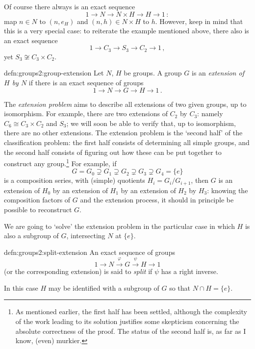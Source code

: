 Of course there always is an exact sequence
\[1 \longrightarrow N \longrightarrow N \times H \longrightarrow H
  \longrightarrow 1\,:\] map $n \in N$ to $(n, e_H)$ and
$(n, h) \in N \times H$ to $h$.  However, keep in mind that this is a
very special case: to reiterate the example mentioned above, there
also is an exact sequence
\[1 \longrightarrow C_3 \longrightarrow S_3 \longrightarrow C_2
  \longrightarrow 1\,,\] yet $S_3 \not\cong C_3 \times C_2$.
\begin{defn}{}{defn:groups2:group-extension}
  Let $N$, $H$ be groups. A group $G$ is an \emph{extension of $H$ by
    $N$} if there is an exact sequence of groups
  \[1 \longrightarrow N \longrightarrow G \longrightarrow H
    \longrightarrow 1\,.\]
\end{defn}
The \emph{extension problem} aims to describe all extensions of two
given groups, up to isomorphism. For example, there are two extensions
of $C_2$ by $C_3$: namely $C_6 \cong C_3 \times C_2$ and $S_3$; we
will soon be able to verify that, up to isomorphism, there are no
other extensions.  The extension problem is the `second half' of the
classification problem: the first half consists of determining all
simple groups, and the second half consists of figuring out how these
can be put together to construct any group.\footnote{As mentioned
  earlier, the first half has been settled, although the complexity of
  the work leading to its solution justifies some skepticism
  concerning the absolute correctness of the proof. The status of the
  second half is, as far as I know, (even) murkier.} For example, if
\[G = G_0 \supsetneq G_1 \supsetneq G_2 \supsetneq G_3 \supsetneq G_4
  = \{e\}\] is a composition series, with (simple) quotients
$H_i = G_i/G_{i+1}$, then $G$ is an extension of $H_0$ by an extension
of $H_1$ by an extension of $H_2$ by $H_3$: knowing the composition
factors of $G$ and the extension process, it should in principle be
possible to reconstruct $G$.

We are going to `solve' the extension problem in the particular case
in which $H$ is also a subgroup of $G$, intersecting $N$ at $\{e\}$.
\begin{defn}{}{defn:groups2:split-extension}
  An exact sequence of groups
  \[1 \longrightarrow N \xrightarrow{\varphi} G \xrightarrow{\psi} H
    \longrightarrow 1\] (or the corresponding extension) is said to
  \emph{split} if $\psi$ has a right inverse.

  In this case $H$ may be identified with a subgroup of $G$ so that
  $N \cap H = \{e\}$.
\end{defn}

